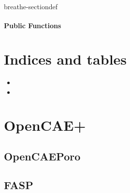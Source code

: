 \documentclass[letterpaper,10pt,english]{sphinxmanual}
\begin{document}
\begin{fulllineitems}
\label{\detokenize{api/classtest:_CPPv44test}}
\pysigstartsignatures
\pysigstartmultiline
{}
\pysigstopmultiline
\pysigstopsignatures
\begin{sphinxuseclass}{breathe-sectiondef}\subsubsection*{Public Functions}

\begin{fulllineitems}
\label{\detokenize{api/classtest:_CPPv4N4test4testEv}}
\pysigstartsignatures
\pysigstartmultiline
{}
\pysigstopmultiline
\pysigstopsignatures
\end{fulllineitems}


\end{sphinxuseclass}
\end{fulllineitems}



\chapter{Indices and tables}
\label{\detokenize{index:indices-and-tables}}\begin{itemize}
\item {} 
\sphinxAtStartPar
{}

\item {} 
\sphinxAtStartPar
{}

\end{itemize}


\chapter{OpenCAE+}
\label{\detokenize{index:opencae}}

\section{OpenCAEPoro}
\label{\detokenize{index:opencaeporo}}

\section{FASP}
\label{\detokenize{index:fasp}}


\renewcommand{\indexname}{Index}
\printindex
\end{document}
